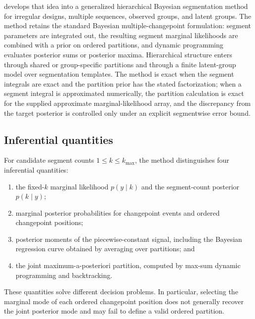 \BayesBreak develops that idea into a generalized hierarchical Bayesian segmentation method for irregular designs, multiple sequences, observed groups, and latent groups. The method retains the standard Bayesian multiple-changepoint formulation: segment parameters are integrated out, the resulting segment marginal likelihoods are combined with a prior on ordered partitions, and dynamic programming evaluates posterior sums or posterior maxima. Hierarchical structure enters through shared or group-specific partitions and through a finite latent-group model over segmentation templates. The method is exact when the segment integrals are exact and the partition prior has the stated factorization; when a segment integral is approximated numerically, the partition calculation is exact for the supplied approximate marginal-likelihood array, and the discrepancy from the target posterior is controlled only under an explicit segmentwise error bound.

\subsection{Inferential quantities}
For candidate segment counts $1\le k\le k_{\max}$, the method distinguishes four inferential quantities:
\begin{enumerate}
  \item the fixed-$k$ marginal likelihood $p(y\mid k)$ and the segment-count posterior $p(k\mid y)$;
  \item marginal posterior probabilities for changepoint events and ordered changepoint positions;
  \item posterior moments of the piecewise-constant signal, including the Bayesian regression curve obtained by averaging over partitions; and
  \item the joint maximum-a-posteriori partition, computed by max-sum dynamic programming and backtracking.
\end{enumerate}
These quantities solve different decision problems. In particular, selecting the marginal mode of each ordered changepoint position does not generally recover the joint posterior mode and may fail to define a valid ordered partition.

